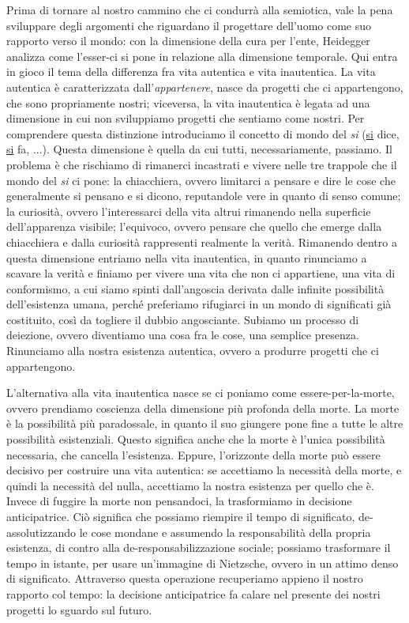 \documentclass[a4paper,12pt,oneside]{article}%
\begin{document}
Prima di tornare al nostro cammino che ci condurrà alla semiotica, vale la pena sviluppare degli argomenti che riguardano il progettare dell'uomo come suo rapporto verso il mondo: con la dimensione della cura per l'ente, Heidegger analizza come l’esser-ci si pone in relazione alla dimensione temporale.
Qui entra in gioco il tema della differenza fra vita autentica e vita inautentica.
La vita autentica è caratterizzata dall'\textit{appartenere}, nasce da progetti che ci appartengono, che sono propriamente nostri; viceversa, la vita inautentica è legata ad una dimensione in cui non sviluppiamo progetti che sentiamo come nostri.
Per comprendere questa distinzione introduciamo il concetto di mondo del \textit{si} (\underline{si} dice, \underline{si} fa, ...). Questa dimensione è quella da cui tutti, necessariamente, passiamo. Il problema è che rischiamo di rimanerci incastrati e vivere nelle tre trappole che il mondo del \textit{si} ci pone: la chiacchiera, ovvero limitarci a pensare e dire le cose che generalmente si pensano e si dicono, reputandole vere in quanto di senso comune; la curiosità, ovvero l’interessarci della vita altrui rimanendo nella superficie dell’apparenza visibile; l’equivoco, ovvero pensare che quello che emerge dalla chiacchiera e dalla curiosità rappresenti realmente la verità.
Rimanendo dentro a questa dimensione entriamo nella vita inautentica, in quanto rinunciamo a scavare la verità e finiamo per vivere una vita che non ci appartiene, una vita di conformismo, a cui siamo spinti dall'angoscia derivata dalle infinite possibilità dell'esistenza umana, perché preferiamo rifugiarci in un mondo di significati già costituito, così da togliere il dubbio angosciante. Subiamo un processo di deiezione, ovvero diventiamo una cosa fra le cose, una semplice presenza. Rinunciamo alla nostra esistenza autentica, ovvero a produrre progetti che ci appartengono.

L’alternativa alla vita inautentica nasce se ci poniamo come essere-per-la-morte, ovvero prendiamo coscienza della dimensione più profonda della morte. La morte è la possibilità più paradossale, in quanto il suo giungere pone fine a tutte le altre possibilità esistenziali. Questo significa anche che la morte è l’unica possibilità necessaria, che cancella l’esistenza. Eppure, l’orizzonte della morte può essere decisivo per costruire una vita autentica: se accettiamo la necessità della morte, e quindi la necessità del nulla, accettiamo la nostra esistenza per quello che è. Invece di fuggire la morte non pensandoci, la trasformiamo in decisione anticipatrice. Ciò significa che possiamo riempire il tempo di significato, de-assolutizzando le cose mondane e assumendo la responsabilità della propria esistenza, di contro alla de-responsabilizzazione sociale; possiamo trasformare il tempo in istante, per usare un’immagine di Nietzsche, ovvero in un attimo denso di significato. Attraverso questa operazione recuperiamo appieno il nostro rapporto col tempo: la decisione anticipatrice fa calare nel presente dei nostri progetti lo sguardo sul futuro.
\end{document}
